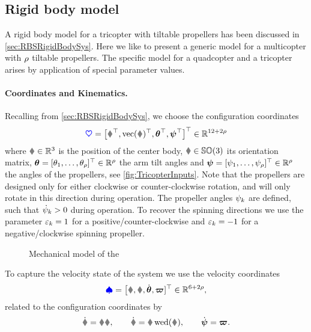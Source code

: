 \subsection{Rigid body model}
A rigid body model for a tricopter with tiltable propellers has been discussed in \autoref{sec:RBSRigidBodySys}.
Here we like to present a generic model for a multicopter with $\numProp$ tiltable propellers.
The specific model for a quadcopter and a tricopter arises by application of special parameter values.

\paragraph{Coordinates and Kinematics.}
Recalling from \autoref{sec:RBSRigidBodySys}, we choose the configuration coordinates 
\begin{align}
 \sysCoord = \big[ \r^\top, \vectorize(\R)^\top, \tuple{\PropTilt}^\top, \tuple{\PropAngle}^\top \big]^\top \in \RealNum^{12+2\numProp}
\end{align}
where $\r \in \RealNum^3$ is the position of the center body, $\R \in \SpecialOrthogonalGroup(3)$ its orientation matrix, $\tuple{\PropTilt} = [\PropTilt[1], \ldots, \PropTilt[\numProp]]^\top \in \RealNum^{\numProp}$ the arm tilt angles and $\tuple{\PropAngle} = [\PropAngle[1],\ldots,\PropAngle[\numProp]]^\top \in \RealNum^{\numProp}$ the angles of the propellers, see \autoref{fig:TricopterInputs}.
Note that the propellers are designed only for either clockwise or counter-clockwise rotation, and will only rotate in this direction during operation.
The propeller angles $\PropAngle[k]$ are defined, such that $\PropAngled[k] > 0$ during operation.
To recover the spinning directions we use the parameter $\PropDir[k] = 1$ for a positive/counter-clockwise and $\PropDir[k] = -1$ for a negative/clockwise spinning propeller.

\begin{figure}
 \centering
 
 \caption{Mechanical model of the \Tricopter}
 \label{fig:TricopterInputs}
\end{figure}

To capture the velocity state of the system we use the velocity coordinates
\begin{align}
 \sysVel = \big[ \v, \w, \dot{\tuple{\PropTilt}}, \tuple{\PropVel}]^\top \in \RealNum^{6+2\numProp},
\end{align}
related to the configuration coordinates by
\begin{align}
 \rd = \R \v, 
\qquad
 \Rd = \R \wedOp(\w),
\qquad
 \dot{\tuple{\PropAngle}} = \tuple{\PropVel}.
\end{align}

